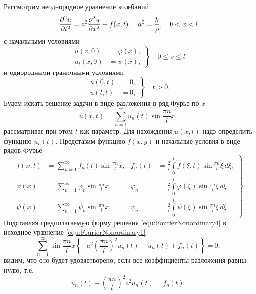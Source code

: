 Рассмотрим неоднородное уравнение колебаний
\begin{equation}
	\frac{\partial^{2}u}{\partial t^{2}} = a^2 \frac{\partial^{2}u}{\partial x^{2}} + f(x, t), \quad a^2 = \frac{k}{\rho}, \quad 0 < x < l
	\label{equ:FourierNonordinary1}
\end{equation}
с начальными условиями
\begin{equation}
	\left.
	\begin{aligned}
		u(x, 0) &= \varphi(x),\\
		u_t(x, 0) &= \psi(x),
	\end{aligned}
	\right\} \quad 0 \leqslant x \leqslant l
	\label{equ:FourierNonordinary2}
\end{equation}
и однородными граничными условиями
\begin{equation}
	\left.
	\begin{aligned}
		u(0, t) &= 0,\\
		u(l, t) &= 0,
	\end{aligned}
	\right\} \quad t > 0.
	\label{equ:FourierNonordinary3}
\end{equation}
Будем искать решение задачи в виде разложения в ряд Фурье по $x$
\begin{equation}
	u(x, t) = \sum\limits_{n = 1}^{\infty} u_n(t) \sin \frac{\pi n}{l}x,
	\label{equ:FourierNonordinary4}
\end{equation}
рассматривая при этом $t$ как параметр. Для нахождения $u(x, t)$ надо определить функцию $u_n(t)$. Представим функцию $f(x, y)$ и начальные условия в виде рядов Фурье:
\begin{equation}
	\left.
	\begin{aligned}
		f(x, t) &= \sum\limits_{n = 1}^{\infty} f_n (t) \sin \frac{\pi n}{l} x, &f_n(t) &= \frac{2}{l} \int\limits_0^l f(\xi, t) \sin \frac{\pi n}{l} \xi\, d \xi;\\
		\varphi(x) &= \sum\limits_{n = 1}^{\infty} \varphi_n \sin \frac{\pi n}{l}x, &\varphi_n &= \frac{2}{l} \int\limits_0^l \varphi(\xi) \sin \frac{\pi n}{l} \xi \, d\xi\\
		\psi(x) &= \sum\limits_{n = 1}^{\infty} \psi_n \sin \frac{\pi n}{l}x, &\psi_n &= \frac{2}{l} \int\limits_0^l \psi(\xi) \sin \frac{\pi n}{l} \xi \, d\xi
	\end{aligned}
	\right\} 
	\label{equ:FourierNonordinary5}
\end{equation}
Подставляя предполагаемую форму решения \eqref{equ:FourierNonordinary4} в исходное уравнение  \eqref{equ:FourierNonordinary1}
\[
	\sum\limits_{n = 1}^\infty \sin \frac{\pi n}{l} x \left\{- a^2 \left(\frac{\pi n}{l} \right)^2 u_n(t) - \ddot u_n (t) + f_n (t) \right\} = 0,
\]
видим, что оно будет удовлетворено, если все коэффициенты разложения равны нулю, т.е.
\begin{equation}
	\ddot u_n(t) + \left(\frac{\pi n}{l} \right)^2 a^2 u_n (t) = f_n (t).
	\label{equ:FourierNonordinary6}
\end{equation}

